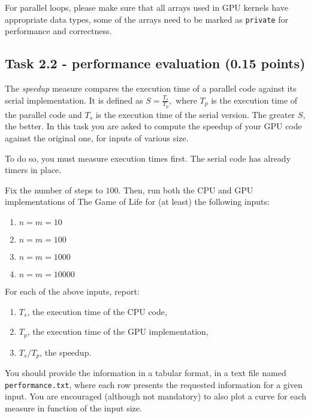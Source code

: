 \documentclass[a4paper, 11pt]{article}
\begin{document}
	For parallel loops, please make sure that all arrays used in GPU kernels have appropriate data types, some of the arrays need to be marked as \texttt{private} for performance and correctness. 

        \subsection{Task 2.2 - performance evaluation (0.15 points)} 

	        The \emph{speedup} measure compares the execution time of a parallel code against its serial implementation. It is defined as
        \begin{math}
        S = \frac{T_s}{T_p},
        \end{math}
        where $T_p$ is the execution time of the parallel code and $T_s$ is the execution time of the serial version. The greater $S$, the better.
        In this task you are asked to compute the speedup of your GPU code against the original one, for inputs of various size.

        To do so, you must measure execution times first. The serial code has already timers in place.  

        Fix the number of steps to $100$. Then, run both the CPU and GPU implementations of The Game of Life for (at least) the following inputs:
        \begin{enumerate}
                \item $n = m = 10$
                \item $n = m = 100$
                \item $n = m = 1000$
                \item $n = m = 10000$
        \end{enumerate}

        \noindent For each of the above inputs, report:

        \begin{enumerate}
                \item $T_s$, the execution time of the CPU code,
                \item $T_p$, the execution time of the GPU implementation,
                \item $T_s/T_p$, the speedup.
        \end{enumerate}

You should provide the information in a tabular format, in a text file named \texttt{performance.txt}, where each row presents the requested information for a given input. You are encouraged (although not mandatory) to also plot a curve for each measure in function of the input size.
\end{document}
